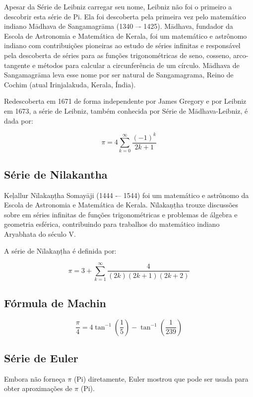 \documentclass[12pt]{article}
\begin{document}
Apesar da Série de Leibniz carregar seu nome, Leibniz não foi o primeiro a descobrir esta série de Pi. Ela foi descoberta pela primeira vez pelo matemático indiano Mādhava de Sangamagrāma (1340 –- 1425). Mādhava, fundador da Escola de Astronomia e Matemática de Kerala, foi um matemático e astrônomo indiano com contribuições pioneiras ao estudo de séries infinitas e responsável pela descoberta de séries para as funções trigonométricas de seno, cosseno, arco-tangente e métodos para calcular a circunferência de um círculo. Mādhava de Sangamagrāma leva esse nome por ser natural de Sangamagrama, Reino de Cochim (atual Irinjalakuda, Kerala, Índia).

Redescoberta em 1671 de forma independente por James Gregory e por Leibniz em 1673, a série de Leibniz, também conhecida por Série de Mādhava-Leibniz, é dada por:

\[\pi=4\sum\limits_{k=0}^{\infty}\frac{(-1)^{k}}{2k + 1}\]

\subsection{Série de Nilakantha}

Keļallur Nīlakaṇṭha Somayāji (1444 -– 1544) foi um matemático e astrônomo da Escola de Astronomia e Matemática de Kerala. Nīlakaṇṭha trouxe discussões sobre em séries infinitas de funções trigonométricas e problemas de álgebra e geometria esférica, contribuindo para trabalhos do matemático indiano Aryabhata do século V.

A série de Nīlakaṇṭha é definida por:

\[\pi=3+\sum\limits_{k=1}^{\infty}\frac{4}{(2k)(2k+1)(2k+2)}\]

\subsection{Fórmula de Machin}

\[\frac{\pi}{4}=4\tan^{-1}(\frac{1}{5})-\tan^{-1}(\frac{1}{239})\]

\subsection{Série de Euler}

Embora não forneça \begin{math}\pi\end{math} (Pi) diretamente, Euler mostrou que pode ser usada para obter aproximações de \begin{math}\pi\end{math} (Pi).
\end{document}
